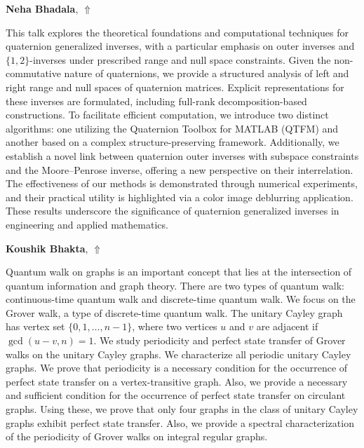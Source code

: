 \documentclass[ILAS2025-program.tex]{subfiles}
\begin{document}
\hypertarget{down0102}{}\begin{ilasabstract}
    
\textbf{Neha Bhadala},  \hfill \hyperlink{up0102}{$\Uparrow$}
    
    
\mtskip
    This talk explores the theoretical foundations and computational techniques for quaternion generalized inverses, with a particular emphasis on outer inverses and $\{1,2\}$-inverses under prescribed range and null space constraints. Given the non-commutative nature of quaternions, we provide a structured analysis of left and right range and null spaces of quaternion matrices. Explicit representations for these inverses are formulated, including full-rank decomposition-based constructions. To facilitate efficient computation, we introduce two distinct algorithms: one utilizing the Quaternion Toolbox for MATLAB (QTFM) and another based on a complex structure-preserving framework. Additionally, we establish a novel link between quaternion outer inverses with subspace constraints and the Moore–Penrose inverse, offering a new perspective on their interrelation. The effectiveness of our methods is demonstrated through numerical experiments, and their practical utility is highlighted via a color image deblurring application. These results underscore the significance of quaternion generalized inverses in engineering and applied mathematics.
\end{ilasabstract}
    

\hypertarget{down0081}{}\begin{ilasabstract}
    
\textbf{Koushik Bhakta},  \hfill \hyperlink{up0081}{$\Uparrow$}
    
    
\mtskip
    Quantum walk on graphs is an important concept that lies at the intersection of quantum information and graph theory. There are two types of quantum walk: continuous-time quantum walk and discrete-time quantum walk. We focus on the Grover walk, a type of discrete-time quantum walk. The unitary Cayley graph  has vertex set $\{0,1, \hdots ,n-1\}$, where two vertices  $u$ and $v$ are adjacent if $\gcd(u - v, n) = 1$. We study periodicity and perfect state transfer of Grover walks on the unitary Cayley graphs. We characterize all periodic unitary Cayley graphs. We prove that periodicity is a necessary condition for the occurrence of perfect state transfer on a vertex-transitive graph. Also, we provide a necessary and sufficient condition for the occurrence of perfect state transfer on circulant graphs. Using these, we prove that only four graphs in the class of unitary Cayley graphs exhibit perfect state transfer. Also, we provide a spectral characterization of the periodicity of Grover walks on integral regular graphs.

\end{ilasabstract}
    
\end{document}
